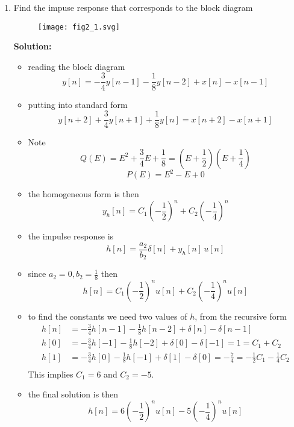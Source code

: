 \documentclass{article}
\begin{document}
\begin{enumerate}
\item Find the impuse response that corresponds to the block diagram

  \begin{figure}
    \centering
    \texttt{[image: fig2\_1.svg]}
  \end{figure}
  \textbf{Solution:}
  \begin{itemize}
  \item reading the block diagram
    \[
    y[n] = -\frac{3}{4} y[n-1] - \frac{1}{8} y[n-2] + x[n] - x[n-1]
    \]
  \item putting into standard form
    \[
    y[n+2] + \frac{3}{4} y[n+1] + \frac{1}{8} y[n] = x[n+2] - x[n+1]
    \]
  \item Note
    \[
    Q(E) = E^2 + \frac{3}{4}E + \frac{1}{8} = \left(E + \frac{1}{2}\right)\left(E + \frac{1}{4}\right)
    \]
    \[
    P(E) = E^2 - E + 0
    \]
  \item the homogeneous form is then
    \[
    y_h[n] = C_1 \left(-\frac{1}{2}\right)^n + C_2\left(-\frac{1}{4}\right)^n
    \]
  \item the impulse response is
    \[
    h[n] = \frac{a_2}{b_2}\delta[n] + y_h[n]\, u[n]
    \]
  \item since $a_2 = 0, b_2 = \frac{1}{8}$ then
    \[
    h[n] = C_1 \left(-\frac{1}{2}\right)^n u[n] + C_2\left(-\frac{1}{4}\right)^n u[n]
    \]
  \item to find the constants we need two values of $h$, from the recursive form
    \begin{align}
      h[n] &= -\frac{3}{4} h[n-1] - \frac{1}{8} h[n-2] + \delta[n] - \delta[n-1]\\
      h[0] &= -\frac{3}{4} h[-1] - \frac{1}{8} h[-2] + \delta[0] - \delta[-1] = 1 = C_1 + C_2\\
      h[1] &= -\frac{3}{4} h[0] - \frac{1}{8} h[-1] + \delta[1] - \delta[0] = -\frac{7}{4} = -\frac{1}{2} C_1 -\frac{1}{4} C_2\\
    \end{align}
    This implies $C_1 = 6$ and $C_2 = -5$.
  \item the final solution is then
    \[
    h[n] = 6 \left(-\frac{1}{2}\right)^n u[n] -5 \left(-\frac{1}{4}\right)^n u[n]
    \]
    
  \end{itemize}

\end{enumerate}
\end{document}
